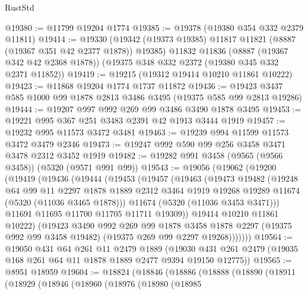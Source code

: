 \begin{lexlean}{RustStd}
\begin{coremodule}
@19380 := @11799 @19204 @1774
@19385 := @19378 (@19380 @354 @332 @2379 @11811)
@19414 := @19330
    (@19342 (@19373 @19385) @11817 @11821 (@8887 (@19367 @351 @42 @2377 @1878)) @19385)
    @11832
    @11836
    (@8887 (@19367 @342 @42 @2368 @1878))
    (@19375 @348 @332 @2372 (@19380 @345 @332 @2371 @11852))
@19419 := @19215 (@19312 @19414 @10210 @11861 @10222)
@19423 := @11868 @19204 @1774 @1737 @11872
@19436 := @19423 @3437 @585 @1000 @99 @1878 @2813 @3486 @3495 (@19375 @585 @99 @2813 @19286)
@19444 := @19207 @997 @992 @269 @99 @3486 @3490 @1878 @3495
@19453 := @19221 @995 @367 @251 @3483 @2391 @42 @1913 @3444 @1919
@19457 := @19232 @995 @11573 @3472 @3481
@19463 := @19239 @994 @11599 @11573 @3472 @3479 @2346
@19473 := @19247 @992 @590 @99 @256 @3458 @3471 @3478 @2312 @3452 @1919
@19482 := @19282 @991 @3458 (@9565 (@9566 @3458)) (@5320 (@9571 @991 @99))
@19543 := @19056
    (@19062
      (@19200
        (@19419
          (@19436
            (@19444
              (@19453
                (@19457
                  (@19463
                    (@19473
                      @19482
                      (@19248
                        @64
                        @99
                        @11
                        @2297
                        @1878
                        @1889
                        @2312
                        @3464
                        @1919
                        @19268
                        @19289
                        @11674
                        (@5320 (@11036 @3465 @1878)))
                      @11674
                      (@5320 (@11036 @3453 @3471)))
                    @11691
                    @11695
                    @11700
                    @11705
                    @11711
                    @19309))
                @19414
                @10210
                @11861
                @10222)
              (@19423
                @3490
                @992
                @269
                @99
                @1878
                @3458
                @1878
                @2297
                (@19375 @992 @99 @3458 @19482)
                (@19375 @269 @99 @2297 @19268)))))))
@19564 := @19050
    @431
    @64
    @261
    @11
    @2479
    @1889
    (@19030 @431 @261 @2479 (@19035 @168 @261 @64 @11 @1878 @1889 @2477 @9394 @19150 @12775))
@19565 := @8951 @18959
@19604 := @18824
    (@18846
      (@18886
        (@18888
          (@18890
            (@18911
              (@18929
                (@18946
                  (@18960
                    (@18976
                      (@18980
                        (@18985

\end{coremodule}
\end{lexlean}
